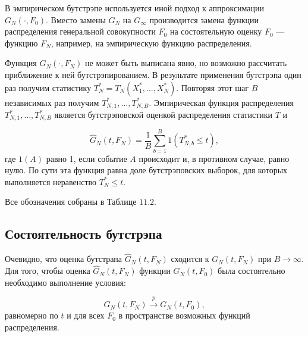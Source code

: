 В эмпирическом бутстрэпе используется иной подход к аппроксимации $G_N(\cdot,F_0)$. Вместо замены $G_N$ на $G_{\infty}$ производится замена функции распределения генеральной совокупности $F_0$ на состоятельную оценку $F_0$ --- функцию $F_N$, например, на  эмпирическую функцию  распределения.

Функция $G_N(\cdot,F_N)$ не может быть выписана явно, но возможно рассчитать приближение к ней бутстрэпированием. В результате применения бутстрэпа один раз получим статистику $T_N^*=T_N(X_1^*,\ldots ,X_N^*)$. Повторяя этот шаг $B$ независимых раз получим $T_{N,1}^*,\ldots ,T_{N,B}^*$. Эмпирическая функция распределения $T_{N,1}^*,\ldots ,T_{N,B}^*$ является бутстрэповской оценкой распределения статистики $T$ и

\begin{equation}
\hat{G}_N(t,F_N)=\dfrac{1}{B}\sum_{b=1}^{B}1(T_{N,b}^* \leq t),
\end{equation}
где $1(A)$ равно 1, если событие $A$ происходит и, в противном случае, равно нулю. По сути эта функция равна доле бутстрэповских выборок, для которых выполняется неравенство $T_N^* \leq t$.

Все обозначения собраны в Таблице $11.2$.


\subsection{Состоятельность бутстрэпа}

Очевидно, что оценка бутстрапа $\hat{G}_N(t,F_N)$ сходится к $G_N(t,F_N)$ при $B \rightarrow \infty$. Для того, чтобы оценка $\hat{G}_N(t,F_N)$ функции $G_N(t,F_0)$ была состоятельно необходимо выполнение условия:

\[
G_N(t,F_N) \stackrel{p}{\rightarrow} G_N(t,F_0),
\]
равномерно по $t$ и для всех $F_0$ в пространстве возможных функций  распределения.

